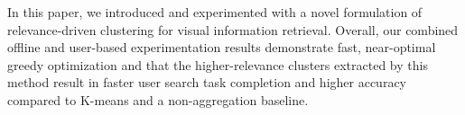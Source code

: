 



In this paper, we introduced and experimented with a novel formulation of relevance-driven clustering for visual information retrieval.
Overall, our combined offline and user-based experimentation results demonstrate fast, near-optimal greedy optimization and that the higher-relevance clusters extracted by this method result in faster user search task completion and higher accuracy compared to K-means and a non-aggregation baseline.




